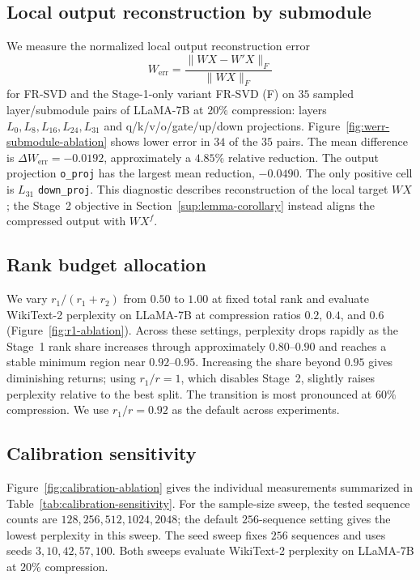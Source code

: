 

\subsection{Local output reconstruction by submodule}\label{app:submodule-reconstruction}
We measure the normalized local output reconstruction error
\begin{equation}
W_{\mathrm{err}}=\frac{\|WX-W'X\|_F}{\|WX\|_F}
\label{eq:app-werr}
\end{equation}
for FR-SVD and the Stage-1-only variant FR-SVD (F) on $35$ sampled layer/submodule pairs of LLaMA-7B at $20\%$ compression: layers $L_0,L_8,L_{16},L_{24},L_{31}$ and q/k/v/o/gate/up/down projections. Figure~\ref{fig:werr-submodule-ablation} shows lower error in $34$ of the $35$ pairs. The mean difference is $\Delta W_{\mathrm{err}}=-0.0192$, approximately a $4.85\%$ relative reduction. The output projection \texttt{o\_proj} has the largest mean reduction, $-0.0490$. The only positive cell is $L_{31}$ \texttt{down\_proj}. This diagnostic describes reconstruction of the local target $WX$; the Stage~2 objective in Section~\ref{sup:lemma-corollary} instead aligns the compressed output with $WX^f$.



\subsection{Rank budget allocation}\label{app:rank-allocation}
We vary $r_1/(r_1+r_2)$ from $0.50$ to $1.00$ at fixed total rank and evaluate WikiText-2 perplexity on LLaMA-7B at compression ratios $0.2$, $0.4$, and $0.6$ (Figure~\ref{fig:r1-ablation}). Across these settings, perplexity drops rapidly as the Stage~1 rank share increases through approximately $0.80$--$0.90$ and reaches a stable minimum region near $0.92$--$0.95$. Increasing the share beyond $0.95$ gives diminishing returns; using $r_1/r=1$, which disables Stage~2, slightly raises perplexity relative to the best split. The transition is most pronounced at $60\%$ compression. We use $r_1/r=0.92$ as the default across experiments.



\subsection{Calibration sensitivity}\label{app:calibration-sensitivity}
Figure~\ref{fig:calibration-ablation} gives the individual measurements summarized in Table~\ref{tab:calibration-sensitivity}. For the sample-size sweep, the tested sequence counts are $128,256,512,1024,2048$; the default $256$-sequence setting gives the lowest perplexity in this sweep. The seed sweep fixes $256$ sequences and uses seeds $3,10,42,57,100$. Both sweeps evaluate WikiText-2 perplexity on LLaMA-7B at $20\%$ compression.

